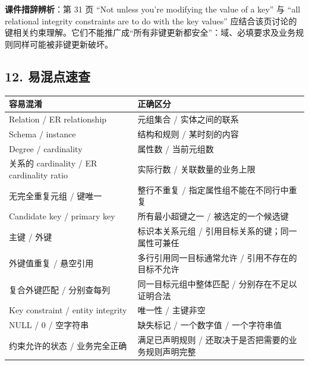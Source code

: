 \textbf{课件措辞辨析}：第 31 页 ``Not unless you're modifying the value of a key'' 与 ``all relational integrity constraints are to do with the key values'' 应结合该页讨论的键相关约束理解。它们不能推广成``所有非键更新都安全''：域、必填要求及业务规则同样可能被非键更新破坏。

\subsection{12. 易混点速查}\label{03_relational_model_and_integrity_zh-ux6613ux6df7ux70b9ux901fux67e5}

\begin{longtable}[]{@{}
  >{\raggedright\arraybackslash}p{}
  >{\raggedright\arraybackslash}p{}@{}}
\toprule\noalign{}
\begin{minipage}[b]{\linewidth}\raggedright
容易混淆
\end{minipage} & \begin{minipage}[b]{\linewidth}\raggedright
正确区分
\end{minipage} \\
\midrule\noalign{}
\endhead
\bottomrule\noalign{}
\endlastfoot
Relation / ER relationship & 元组集合 / 实体之间的联系 \\
Schema / instance & 结构和规则 / 某时刻的内容 \\
Degree / cardinality & 属性数 / 当前元组数 \\
关系的 cardinality / ER cardinality ratio & 实际行数 / 关联数量的业务上限 \\
无完全重复元组 / 键唯一 & 整行不重复 / 指定属性组不能在不同行中重复 \\
Candidate key / primary key & 所有最小超键之一 / 被选定的一个候选键 \\
主键 / 外键 & 标识本关系元组 / 引用目标关系的键；同一属性可兼任 \\
外键值重复 / 悬空引用 & 多行引用同一目标通常允许 / 引用不存在的目标不允许 \\
复合外键匹配 / 分别查每列 & 同一目标元组中整体匹配 / 分别存在不足以证明合法 \\
Key constraint / entity integrity & 唯一性 / 主键非空 \\
NULL / 0 / 空字符串 & 缺失标记 / 一个数字值 / 一个字符串值 \\
约束允许的状态 / 业务完全正确 & 满足已声明规则 / 还取决于是否把需要的业务规则声明完整 \\
\end{longtable}


